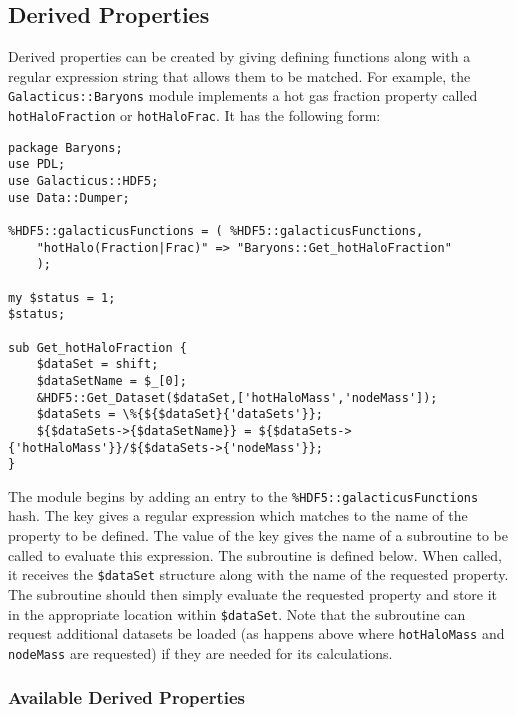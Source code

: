 \subsection{Derived Properties}

Derived properties can be created by giving defining functions along with a regular expression string that allows them to be matched. For example, the {\tt Galacticus::Baryons} module implements a hot gas fraction property called {\tt hotHaloFraction} or {\tt hotHaloFrac}. It has the following form:
\begin{verbatim}
package Baryons;
use PDL;
use Galacticus::HDF5;
use Data::Dumper;

%HDF5::galacticusFunctions = ( %HDF5::galacticusFunctions,
    "hotHalo(Fraction|Frac)" => "Baryons::Get_hotHaloFraction"
    );

my $status = 1;
$status;

sub Get_hotHaloFraction {
    $dataSet = shift;
    $dataSetName = $_[0];
    &HDF5::Get_Dataset($dataSet,['hotHaloMass','nodeMass']);
    $dataSets = \%{${$dataSet}{'dataSets'}};
    ${$dataSets->{$dataSetName}} = ${$dataSets->{'hotHaloMass'}}/${$dataSets->{'nodeMass'}};
}

\end{verbatim}
The module begins by adding an entry to the {\tt \%HDF5::galacticusFunctions} hash. The key gives a regular expression which matches to the name of the property to be defined. The value of the key gives the name of a subroutine to be called to evaluate this expression. The subroutine is defined below. When called, it receives the {\tt \$dataSet} structure along with the name of the requested property. The subroutine should then simply evaluate the requested property and store it in the appropriate location within {\tt \$dataSet}. Note that the subroutine can request additional datasets be loaded (as happens above where {\tt hotHaloMass} and {\tt nodeMass} are requested) if they are needed for its calculations.

\subsubsection{Available Derived Properties}

